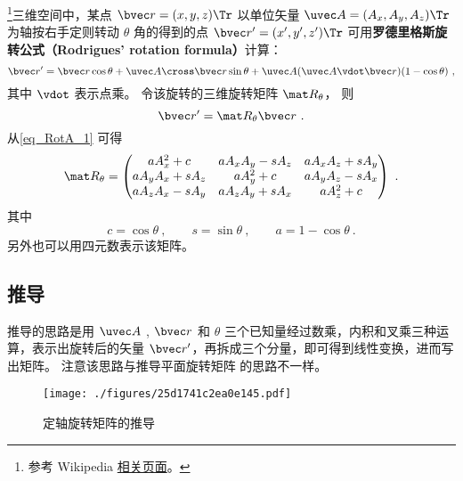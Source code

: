 

\footnote{参考 Wikipedia \href{https://en.wikipedia.org/wiki/Rodrigues'_rotation_formula}{相关页面}。}三维空间中，某点 $\bvec r=(x,y,z)\Tr$ 以单位矢量 $\uvec A=(A_x, A_y, A_z)\Tr$ 为轴按右手定则转动 $\theta$ 角的得到的点 $\bvec r'=(x',y',z')\Tr$ 可用\textbf{罗德里格斯旋转公式（Rodrigues' rotation formula）}计算：
\begin{equation}\label{eq_RotA_1}
\bvec r' = \bvec r \cos\theta + \uvec A \cross \bvec r \sin\theta + \uvec A (\uvec A \vdot \bvec r) (1 - \cos\theta)~,
\end{equation}
其中 $\vdot$ 表示点乘。 令该旋转的三维旋转矩阵 $\mat R_\theta$， 则
\begin{equation}\label{eq_RotA_2}
\bvec r' = \mat R_\theta \bvec r~.
\end{equation}
从\autoref{eq_RotA_1} 可得
\begin{equation}\label{eq_RotA_3}
\mat R_\theta =
\begin{pmatrix}
a A_x^2 + c & a A_x A_y - s A_z & a A_x A_z + s A_y\\
a A_y A_x + s A_z & a A_y^2 + c & a A_y A_z - s A_x\\
a A_z A_x - s A_y & a A_z A_y + s A_x & a A_z^2 + c
\end{pmatrix}~.\end{equation}
其中
\begin{equation}
c = \cos\theta ~,\qquad s = \sin\theta~, \qquad a = 1 - \cos\theta~.
\end{equation}
另外也可以用四元数表示该矩阵。

\subsection{推导}
推导的思路是用 $\uvec A$ , $\bvec r$ 和 $\theta $ 三个已知量经过数乘，内积和叉乘三种运算，表示出旋转后的矢量 $\bvec r'$，再拆成三个分量，即可得到线性变换，进而写出矩阵。 注意该思路与推导平面旋转矩阵 的思路不一样。
\begin{figure}[ht]
\centering
\texttt{[image: ./figures/25d1741c2ea0e145.pdf]}
\caption{定轴旋转矩阵的推导} \label{fig_RotA_1}
\end{figure} 

